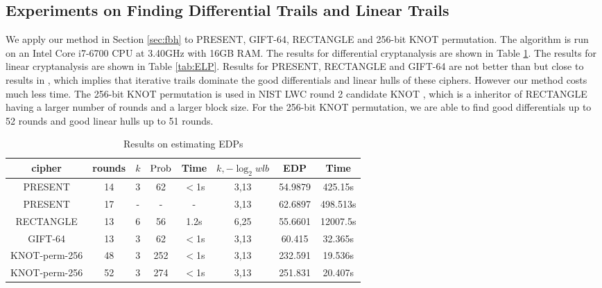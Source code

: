 \subsection{Experiments on Finding Differential Trails and Linear Trails}

We apply our method in Section \ref{sec:fbh} to PRESENT, GIFT-64, RECTANGLE and 256-bit KNOT permutation. The algorithm is run on an Intel Core i7-6700 CPU at 3.40GHz with 16GB RAM. The results for differential cryptanalysis are shown in Table \ref{tab:EDP}. The results for linear cryptanalysis are shown in Table \ref{tab:ELP}. Results for PRESENT, RECTANGLE and GIFT-64 are not better than but close to results in \cite{HV18}, which implies that iterative trails dominate the good differentials and linear hulls of these ciphers. However our method costs much less time. The 256-bit KNOT permutation is used in NIST LWC round 2 candidate KNOT \cite{ZDY19}, which is a inheritor of RECTANGLE having a larger number of rounds and a larger block size. For the 256-bit KNOT permutation, we are able to find good differentials up to 52 rounds and good linear hulls up to 51 rounds. 

\begin{table}
	\caption{Results on estimating EDPs}\label{tab:EDP}
	\centering
	\begin{tabular}{|c|c|c|c|c|c|c|c|}
		\hline
		cipher & rounds & $k$ & $\text{Prob}$ & Time & $k,-\log_2wlb$ & EDP & Time \\
		\hline
		PRESENT & 14 & 3 & 62 & $<$1s & 3,13 & 54.9879 & 425.15s \\
		\hline 
		PRESENT & 17 & - & - & - & 3,13 & 62.6897 & 498.513s\\
		\hline 
		RECTANGLE & 13 & 6 & 56 & 1.2s & 6,25 & 55.6601 & 12007.5s \\
		\hline
		GIFT-64 & 13 & 3 & 62 & $<$1s & 3,13 & 60.415 & 32.365s\\
		\hline
		KNOT-perm-256 & 48 & 3 & 252 & $<$1s & 3,13 & 232.591 & 19.536s\\
		\hline
		KNOT-perm-256 & 52 & 3 & 274 & $<$1s & 3,13 & 251.831 & 20.407s\\
		\hline
	\end{tabular}
\end{table}

